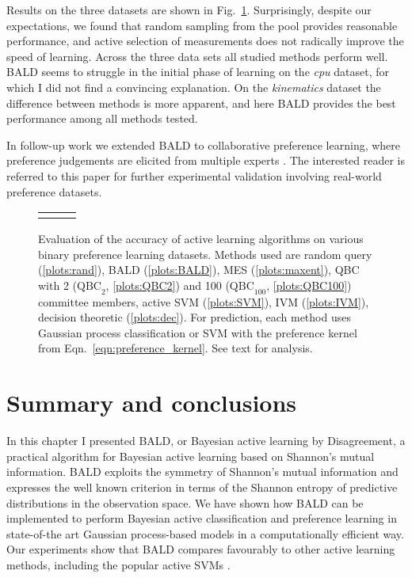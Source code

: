 Results on the three datasets are shown in Fig.\ \ref{fig:BALD_pref_results}.  Surprisingly, despite our expectations, we found that random sampling from the pool provides reasonable performance, and active selection of measurements does not radically improve the speed of learning. Across the three data sets all studied methods perform well. BALD seems to struggle in the initial phase of learning on the \emph{cpu} dataset, for which I did not find a convincing explanation. On the \emph{kinematics} dataset the difference between methods is more apparent, and here BALD provides the best performance among all methods tested.

In follow-up work we extended BALD to collaborative preference learning, where preference judgements are elicited from multiple experts \citep{Houlsby2012preference}. The interested reader is referred to this paper for further experimental validation involving real-world preference datasets.
% 
\begin{figure}
	\begin{center}
	\begin{tabular}{ccc}
	&
	&
	
	\end{tabular}
	\end{center}
	\caption[Evaluation of Bayesian active learning of binary preference relations]{Evaluation of the accuracy of active learning algorithms on various binary preference learning datasets. Methods used are random query (\ref{plots:rand}), BALD (\ref{plots:BALD}),  MES (\ref{plots:maxent}), QBC with 2 ($\mbox{QBC}_2$, \ref{plots:QBC2}) and 100 ($\mbox{QBC}_{100}$, \ref{plots:QBC100}) committee members, active SVM (\ref{plots:SVM}), IVM (\ref{plots:IVM}), decision theoretic \citep{Kapoor2007} (\ref{plots:dec}). For prediction, each method uses Gaussian process classification or SVM with the preference kernel from Eqn.\ \eqref{eqn:preference_kernel}.  See text for analysis. \label{fig:BALD_pref_results}}
\end{figure}

\section{Summary and conclusions}

In this chapter I presented BALD, or Bayesian active learning by Disagreement, a practical algorithm for Bayesian active learning based on Shannon's mutual information. BALD exploits the symmetry of Shannon's mutual information and expresses the well known criterion in terms of the Shannon entropy of predictive distributions in the observation space. We have shown how BALD can be implemented to perform Bayesian active classification and preference learning in state-of-the art Gaussian process-based models in a computationally efficient way. Our experiments show that BALD compares favourably to other active learning methods, including the popular active SVMs \citep{Tong2002}.

